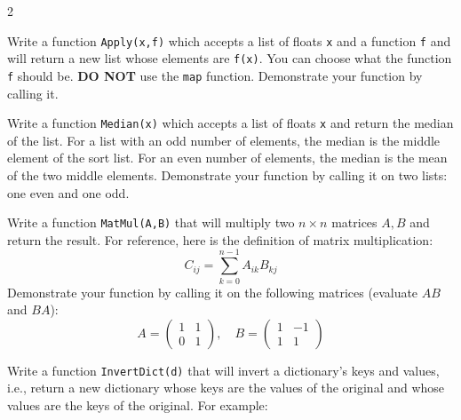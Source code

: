 \documentclass[12pt]{article}%
\newcommand{\code}[1]{\texttt{#1}}
\begin{document}
\begin{multicols*}{2}

\begin{Exercise}[origin={10 points, Python}]

Write a function \code{Apply(x,f)} which accepts a list of floats \code{x} and a function \code{f} and will return a new list whose elements are \code{f(x)}. You can choose what the function \code{f} should be. \textbf{DO NOT} use the \code{map} function. Demonstrate your function by calling it.

\end{Exercise}

\begin{Exercise}[origin={10 points, Python}]

Write a function \code{Median(x)} which accepts a list of floats \code{x} and return the median of the list. For a list with an odd number of elements, the median is the middle element of the sort list. For an even number of elements, the median is the mean of the two middle elements. Demonstrate your function by calling it on two lists: one even and one odd.

\end{Exercise}

\begin{Exercise}[origin={10 points, Python}]

Write a function \code{MatMul(A,B)} that will multiply two $n\times n$ matrices $A,B$ and return the result. For reference, here is the definition of matrix multiplication:
\begin{equation*}
	C_{ij} = \sum_{k=0}^{n-1} A_{ik}B_{kj}
\end{equation*}
Demonstrate your function by calling it on the following matrices (evaluate $AB$ and $BA$):
\begin{equation*}
A = 
\begin{pmatrix}
1 & 1 \\
0 & 1
\end{pmatrix}
, \quad
B = 
\begin{pmatrix}
1 & -1 \\
1 & 1
\end{pmatrix}
\end{equation*}

\end{Exercise}

\begin{Exercise}[origin={10 points, Python}]

Write a function \code{InvertDict(d)} that will invert a dictionary's keys and values, i.e., return a new dictionary whose keys are the values of the original and whose values are the keys of the original. For example:


\end{Exercise}
\end{multicols*}
\end{document}
